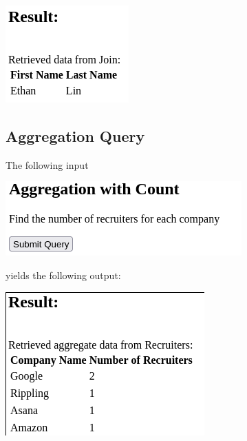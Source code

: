 \includegraphics[width=\linewidth]{src/6/2022-03-30-180426_179x141_scrot.png}

\newpage

\subsection{Aggregation Query}

The following input

\includegraphics[width=0.5\linewidth]{src/6/2022-03-30-180512_343x108_scrot.png}

yields the following output:

\includegraphics[width=\linewidth]{src/6/2022-03-30-180536_289x208_scrot.png}

